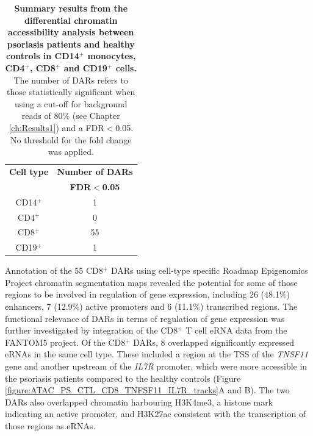 \begin{table}[htbp]
\centering
\begin{tabular}{@{} c c}
\toprule
\textbf{Cell type}   & \textbf{Number of DARs} \\
                     & \textbf{FDR$<$0.05}     \\
\midrule
\midrule
CD14$^+$             & 1 \\                 
CD4$^+$              & 0 \\
CD8$^+$              & 55 \\
CD19$^+$             & 1 \\
\bottomrule 
\end{tabular}
\medskip %
\caption[Summary results from the differential chromatin accessibility analysis between psoriasis patients and healthy controls in CD14$^+$ monocytes, CD4$^+$, CD8$^+$ and CD19$^+$ cells.]{\textbf{Summary results from the differential chromatin accessibility analysis between psoriasis patients and healthy controls in CD14$^+$ monocytes, CD4$^+$, CD8$^+$ and CD19$^+$ cells.} The number of DARs refers to those statistically significant when using a cut-off for background reads of 80\% (see Chapter \ref{ch:Results1}) and a FDR$<$0.05. No threshold for the fold change was applied.}
\label{tab:ATAC_PS_CTL_differential_analysis_results}
\end{table}
\bigskip %


Annotation of the 55 CD8$^+$ DARs using cell-type specific Roadmap Epigenomics Project chromatin segmentation maps revealed the potential for some of those regions to be involved in regulation of gene expression, including 26 (48.1\%) enhancers, 7 (12.9\%) active promoters and 6 (11.1\%) transcribed regions. The functional relevance of DARs in terms of regulation of gene expression was further investigated by integration of the CD8$^+$ T cell eRNA data from the FANTOM5 project. Of the CD8$^+$ DARs, 8 overlapped significantly expressed eRNAs in the same cell type. These included a region at the TSS of the \textit{TNSF11} gene and another upstream of the \textit{IL7R} promoter, which were more accessible in the psoriasis patients compared to the healthy controls (Figure \ref{figure:ATAC_PS_CTL_CD8_TNFSF11_IL7R_tracks}A and B). The two DARs also overlapped chromatin harbouring H3K4me3, a histone mark indicating an active promoter, and H3K27ac consistent with the transcription of those regions as eRNAs.

